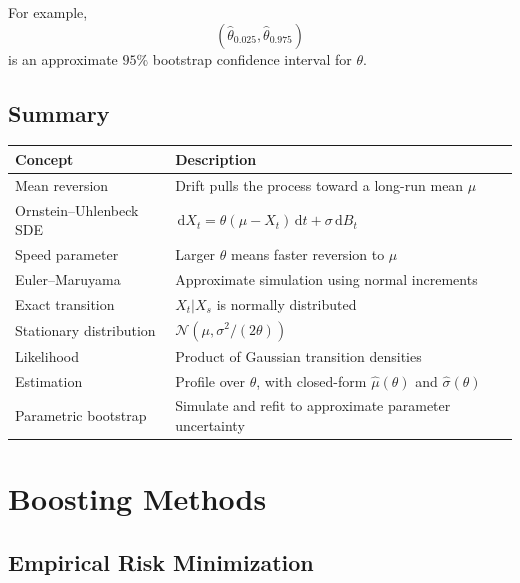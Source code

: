 \documentclass[12pt,oneside]{book}
\numberwithin{equation}{section}
\theoremstyle{definition}
\theoremstyle{plain}
\theoremstyle{remark}
\newcommand{\dd}{\,\mathrm{d}}
\newcommand{\Normal}{\mathcal{N}}
\begin{document}
For example,
\[
\left(
\hat{\theta}_{0.025},
\hat{\theta}_{0.975}
\right)
\]
is an approximate $95\%$ bootstrap confidence interval for $\theta$.

\section{Summary}

\begin{center}
\begin{xltabular}{\textwidth}{>{\raggedright\arraybackslash}p{0.28\textwidth}
>{\raggedright\arraybackslash}X}
\toprule
Concept & Description \\
\midrule
Mean reversion
& Drift pulls the process toward a long-run mean $\mu$ \\

Ornstein--Uhlenbeck SDE
& $\dd X_t=\theta(\mu-X_t)\dd t+\sigma\dd B_t$ \\

Speed parameter
& Larger $\theta$ means faster reversion to $\mu$ \\

Euler--Maruyama
& Approximate simulation using normal increments \\

Exact transition
& $X_t|X_s$ is normally distributed \\

Stationary distribution
& $\Normal(\mu,\sigma^2/(2\theta))$ \\

Likelihood
& Product of Gaussian transition densities \\

Estimation
& Profile over $\theta$, with closed-form $\hat{\mu}(\theta)$ and $\hat{\sigma}(\theta)$ \\

Parametric bootstrap
& Simulate and refit to approximate parameter uncertainty \\
\bottomrule
\end{xltabular}
\end{center}

\chapter{Boosting Methods}

\section{Empirical Risk Minimization}
\end{document}
